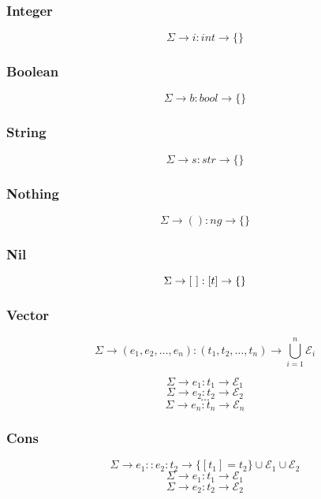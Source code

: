 \documentclass[titlepage]{article}
\begin{document}
\subsubsection{Integer}

$$\Sigma \rightarrow i : int \rightarrow \{\}$$

\subsubsection{Boolean}

$$\Sigma \rightarrow b : bool \rightarrow \{\}$$

\subsubsection{String}

$$\Sigma \rightarrow s : str \rightarrow \{\}$$

\subsubsection{Nothing}

$$\Sigma \rightarrow () : ng \rightarrow \{\}$$

\subsubsection{Nil}

$$\Sigma \rightarrow [ \text{ } ] : [\space t \space ] \rightarrow \{\}$$



\subsubsection{Vector}

$$\Sigma \rightarrow (e_1, e_2, \dots, e_n) : (t_1, t_2, \dots, t_n) \rightarrow \bigcup_{i = 1} ^ n \mathcal{E}_i$$
\noindent\makebox[\linewidth]{\rule{3.15in}{0.4pt}}

$$\Sigma \rightarrow e_1 : t_1 \rightarrow \mathcal{E}_1$$
$$\Sigma \rightarrow e_2 : t_2 \rightarrow \mathcal{E}_2$$
$$\dots$$
$$\Sigma \rightarrow e_n : t_n \rightarrow \mathcal{E}_n$$

\subsubsection{Cons}

$$\Sigma \rightarrow e_1 :: e_2 : t_2 \rightarrow \{[t_1] = t_2\} \cup \mathcal{E}_1 \cup \mathcal{E}_2$$
\noindent\makebox[\linewidth]{\rule{2.8in}{0.4pt}}
$$\Sigma \rightarrow e_1 : t_1 \rightarrow \mathcal{E}_1$$
$$\Sigma \rightarrow e_2 : t_2 \rightarrow \mathcal{E}_2$$
\end{document}
